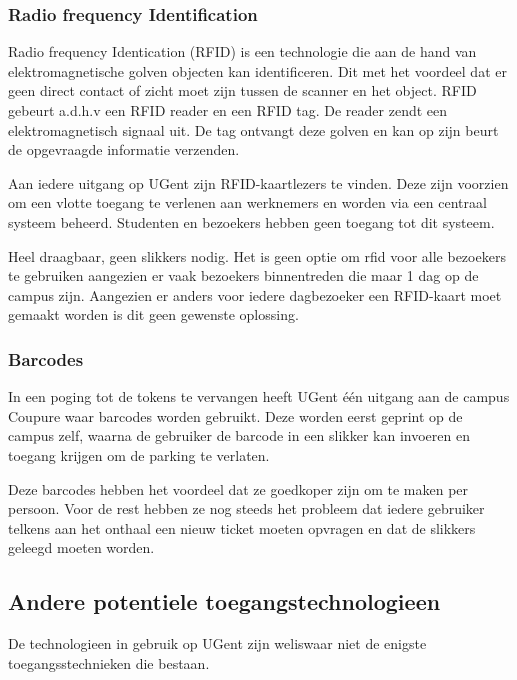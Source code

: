 \subsubsection{Radio frequency Identification}

Radio frequency Identication (RFID) is een technologie die aan de hand van elektromagnetische golven objecten kan identificeren. Dit met het voordeel dat er geen direct contact of zicht moet zijn tussen de scanner en het object. RFID gebeurt a.d.h.v een RFID reader en een RFID tag. De reader zendt een elektromagnetisch signaal uit. De tag ontvangt deze golven en kan op zijn beurt de opgevraagde informatie verzenden. \autocite{li2009design}

Aan iedere uitgang op UGent zijn RFID-kaartlezers te vinden. Deze zijn voorzien om een vlotte toegang te verlenen aan werknemers en worden via een centraal systeem beheerd. Studenten en bezoekers hebben geen toegang tot dit systeem.

Heel draagbaar, geen slikkers nodig.
Het is geen optie om rfid voor alle bezoekers te gebruiken aangezien er vaak bezoekers binnentreden die maar 1 dag op de campus zijn. Aangezien er anders voor iedere dagbezoeker een RFID-kaart moet gemaakt worden is dit geen gewenste oplossing.

\subsubsection{Barcodes}
In een poging tot de tokens te vervangen heeft UGent één uitgang aan de campus Coupure waar barcodes worden gebruikt. Deze worden eerst geprint op de campus zelf, waarna de gebruiker de barcode in een slikker kan invoeren en toegang krijgen om de parking te verlaten.

Deze barcodes hebben het voordeel dat ze goedkoper zijn om te maken per persoon. Voor de rest hebben ze nog steeds het probleem dat iedere gebruiker telkens aan het onthaal een nieuw ticket moeten opvragen en dat de slikkers geleegd moeten worden.

\subsection{Andere potentiele toegangstechnologieen}
De technologieen in gebruik op UGent zijn weliswaar niet de enigste toegangsstechnieken die bestaan.

